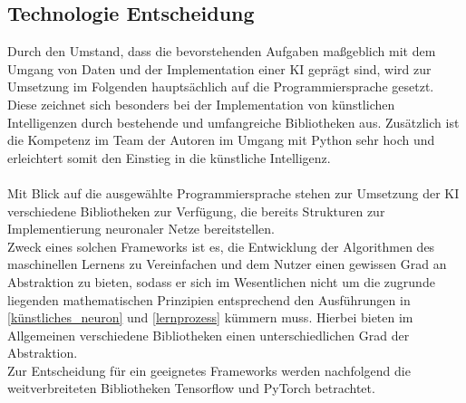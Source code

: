 \subsection{Technologie Entscheidung}
Durch den Umstand, dass die bevorstehenden Aufgaben maßgeblich mit dem Umgang von Daten und der Implementation einer KI geprägt sind, wird zur Umsetzung im Folgenden hauptsächlich auf die Programmiersprache  gesetzt. Diese zeichnet sich besonders bei der Implementation von künstlichen Intelligenzen durch bestehende und umfangreiche Bibliotheken aus. Zusätzlich ist die Kompetenz im Team der Autoren im Umgang mit Python sehr hoch und erleichtert somit den Einstieg in die künstliche Intelligenz.\\\\
Mit Blick auf die ausgewählte Programmiersprache stehen zur Umsetzung der KI verschiedene Bibliotheken zur Verfügung, die bereits Strukturen zur Implementierung neuronaler Netze bereitstellen.\\
Zweck eines solchen Frameworks ist es, die Entwicklung der Algorithmen des maschinellen Lernens zu Vereinfachen und dem Nutzer einen gewissen Grad an Abstraktion zu bieten, sodass er sich im Wesentlichen nicht um die zugrunde liegenden mathematischen Prinzipien entsprechend den Ausführungen in \ref{künstliches_neuron} und \ref{lernprozess} kümmern muss. Hierbei bieten im Allgemeinen verschiedene Bibliotheken einen unterschiedlichen Grad der Abstraktion.\\
Zur Entscheidung für ein geeignetes Frameworks werden nachfolgend die weitverbreiteten Bibliotheken Tensorflow und PyTorch betrachtet.
